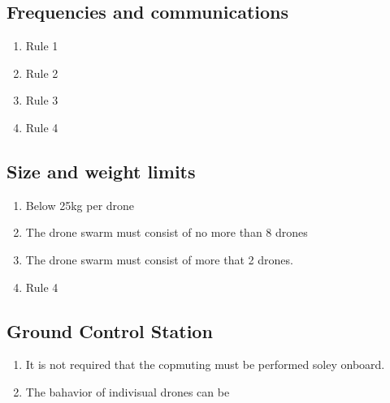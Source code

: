 \subsection{Frequencies and communications}
\begin{enumerate}
	\item{Rule 1}
	\item{Rule 2}
	\item{Rule 3}
	\item{Rule 4}
\end{enumerate}

\subsection{Size and weight limits}
\begin{enumerate}
	\item{Below 25kg per drone}
	\item{The drone swarm must consist of no more than 8 drones}
	\item{The drone swarm must consist of more that 2 drones.}
	\item{Rule 4}
\end{enumerate}

\subsection{Ground Control Station}
\begin{enumerate}
	\item{It is not required that the copmuting must be performed soley onboard.}
	\item{The bahavior of indivisual drones can be}
\end{enumerate}